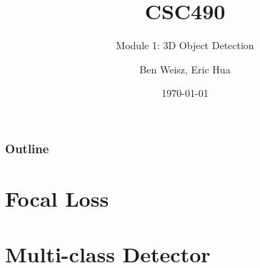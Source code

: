 \documentclass{beamer}
\title{CSC490}
\subtitle{Module 1: 3D Object Detection}
\author{Ben Weisz, Eric Hua}
\institute[U of T]{University of Toronto}
\date{\today}
\begin{document}
\begin{frame}
    \titlepage
\end{frame}

\begin{frame}
    \frametitle{Outline}
    \tableofcontents
\end{frame}

\section{Focal Loss}

\section{Multi-class Detector}
\end{document}
